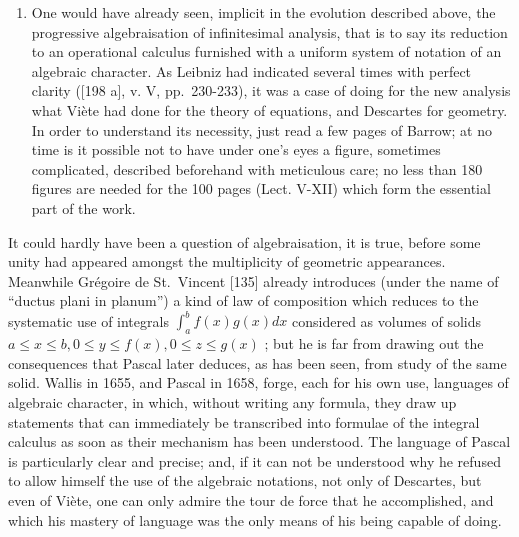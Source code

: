 \begin{enumerate}
\def\labelenumi{\Alph{enumi})}
\setcounter{enumi}{5}
\tightlist
\item
  One would have already seen, implicit in the evolution described above, the progressive algebraisation of infinitesimal analysis, that is to say its reduction to an operational calculus furnished with a uniform system of notation of an algebraic character. As Leibniz had indicated several times with perfect clarity ({[}198 a{]}, v. V, pp.~230-233), it was a case of doing for the new analysis what Viète had done for the theory of equations, and Descartes for geometry. In order to understand its necessity, just read a few pages of Barrow; at no time is it possible not to have under one's eyes a figure, sometimes complicated, described beforehand with meticulous care; no less than 180 figures are needed for the 100 pages (Lect. V-XII) which form the essential part of the work.
\end{enumerate}

It could hardly have been a question of algebraisation, it is true, before some unity had appeared amongst the multiplicity of geometric appearances. Meanwhile Grégoire de St.~Vincent {[}135{]} already introduces (under the name of ``ductus plani in planum'') a kind of law of composition which reduces to the systematic use of integrals \(\int_{a}^{b} f(x) g(x) dx\) considered as volumes of solids \(a \leq x \leq b, 0 \leq y \leq f(x), 0 \leq z \leq g(x)\) ; but he is far from drawing out the consequences that Pascal later deduces, as has been seen, from study of the same solid. Wallis in 1655, and Pascal in 1658, forge, each for his own use, languages of algebraic character, in which, without writing any formula, they draw up statements that can immediately be transcribed into formulae of the integral calculus as soon as their mechanism has been understood. The language of Pascal is particularly clear and precise; and, if it can not be understood why he refused to allow himself the use of the algebraic notations, not only of Descartes, but even of Viète, one can only admire the tour de force that he accomplished, and which his mastery of language was the only means of his being capable of doing.

